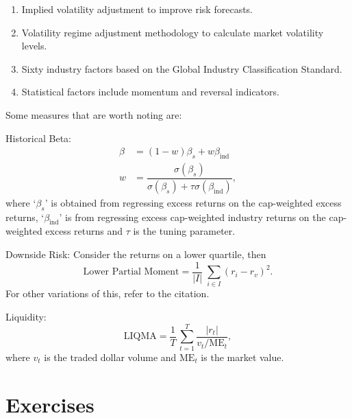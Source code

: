 \begin{enumerate}[--]
\item Implied volatility adjustment to improve risk forecasts.
\item Volatility regime adjustment methodology to calculate market volatility levels.
\item Sixty industry factors based on the Global Industry Classification Standard.
\item Statistical factors include momentum and reversal indicators. 
\end{enumerate}


Some measures that are worth noting are: \twomedskip

\noindent Historical Beta:
	\[
	\begin{split}
	\beta&= (1-w) \beta_s + w \beta_{\text{ind}} \\
	w&= \dfrac{\sigma(\beta_s)}{\sigma(\beta_s) + \tau \sigma(\beta_{\text{ind}})},
	\end{split}
	\]
where `$\beta_s$' is obtained from regressing excess returns on the cap-weighted excess returns, `$\beta_{\text{ind}}$' is from regressing excess cap-weighted industry returns on the cap-weighted excess returns and $\tau$ is the tuning parameter. \twomedskip


\noindent Downside Risk: Consider the returns on a lower quartile, then
	\[
	\text{Lower Partial Moment}= \dfrac{1}{\lvert I \rvert} \; \sum_{i \in I} (r_i - r_v)^2.
	\]
For other variations of this, refer to the citation. \twomedskip


\noindent Liquidity: 
	\[
	\text{LIQMA}= \dfrac{1}{T} \, \sum_{t=1}^T \dfrac{\lvert r_t \rvert}{v_t/\text{ME}_t},
	\]
where $v_t$ is the traded dollar volume and $\text{ME}_t$ is the market value. 



\section{Exercises}


